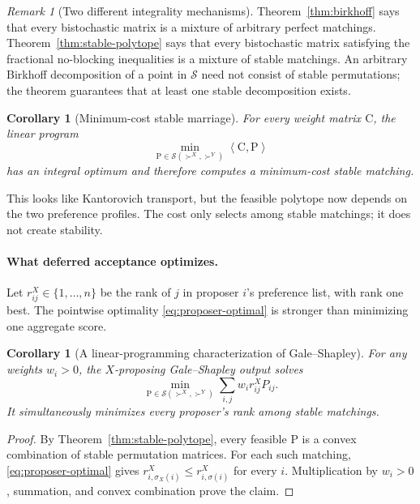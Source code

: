 \documentclass[11pt]{article}
\newtheorem{corollary}[theorem]{Corollary}
\theoremstyle{definition}
\theoremstyle{remark}
\newtheorem{remark}[theorem]{Remark}
\newcommand{\Pmat}{\mathrm P}
\newcommand{\Cmat}{\mathrm C}
\newcommand{\Scal}{\mathcal S}
\newcommand{\ip}[2]{\left\langle #1,#2\right\rangle}
\begin{document}
\begin{remark}[Two different integrality mechanisms]
Theorem~\ref{thm:birkhoff} says that every bistochastic matrix is a mixture of
arbitrary perfect matchings. Theorem~\ref{thm:stable-polytope} says that every
bistochastic matrix satisfying the fractional no-blocking inequalities is a
mixture of stable matchings. An arbitrary Birkhoff decomposition of a point in
\(\Scal\) need not consist of stable permutations; the theorem guarantees that
at least one stable decomposition exists.
\end{remark}

\begin{corollary}[Minimum-cost stable marriage]\label{cor:min-cost-stable}
For every weight matrix \(\Cmat\), the linear program
\begin{equation}\label{eq:min-cost-stable}
  \min_{\Pmat\in\Scal(\succ^X,\succ^Y)}\ip{\Cmat}{\Pmat}
\end{equation}
has an integral optimum and therefore computes a minimum-cost stable matching.
\end{corollary}

This looks like Kantorovich transport, but the feasible polytope now depends on
the two preference profiles. The cost only selects among stable matchings; it
does not create stability.

\paragraph{What deferred acceptance optimizes.}
Let \(r^X_{ij}\in\{1,\ldots,n\}\) be the rank of \(j\) in proposer \(i\)'s
preference list, with rank one best. The pointwise optimality
\eqref{eq:proposer-optimal} is stronger than minimizing one aggregate score.

\begin{corollary}[A linear-programming characterization of Gale--Shapley]
\label{cor:gs-lp}
For any weights \(w_i>0\), the \(X\)-proposing Gale--Shapley output solves
\begin{equation}\label{eq:gs-rank-objective}
  \min_{\Pmat\in\Scal(\succ^X,\succ^Y)}
  \sum_{i,j}w_i r^X_{ij}P_{ij}.
\end{equation}
It simultaneously minimizes every proposer's rank among stable matchings.
\end{corollary}

\begin{proof}
By Theorem~\ref{thm:stable-polytope}, every feasible \(\Pmat\) is a convex
combination of stable permutation matrices. For each such matching,
\eqref{eq:proposer-optimal} gives
\(r^X_{i,\sigma_X(i)}\leq r^X_{i,\sigma(i)}\) for every \(i\). Multiplication by
\(w_i>0\), summation, and convex combination prove the claim.
\end{proof}
\end{document}
